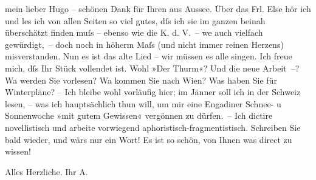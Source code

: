 \pstart
           mein lieber Hugo – schönen Dank für Ihren \label{K_L02419-1v}\label{K_L02419-1} aus Aussee. Über das Frl. Else hör ich und les ich von allen Seiten so viel gutes, dſs ich sie im
               ganzen beinah überschätzt finden muſs – ebenso wie die K. d. V. – we{\geminationn} auch vielfach
               gewürdigt, – doch noch in höherm Maſs (und nicht immer reinen Herzens) misverstanden.
               Nun es ist das alte Lied – wir müssen es alle singen. Ich freue mich, dſs Ihr Stück
               vollendet ist. Wohl »Der Thurm«? Und die neue
               Arbeit –? Wa{\geminationn} werden Sie vorlesen? Wa{\geminationn} kommen Sie nach Wien? Was haben Sie für Winterpläne? – Ich bleibe wohl vorläufig hier; im
                  Jänner{ }soll {\pb}ich in der Schweiz lesen, – was ich hauptsächlich thun
               will, um mir eine Engadiner Schnee- u
               Sonnenwoche \strikeout{\textcolor{gray}{ver}} »mit gutem Gewissen« vergönnen zu dürfen. – Ich dictire novellistisch und
               arbeite vorwiegend aphoristisch-fragmentistisch. Schreiben Sie bald wieder, und wärs
               nur ein Wort! Es ist so schön, von Ihnen was direct zu wissen!\pend
           
\pstart
           Alles Herzliche. Ihr \spacefill\mbox{A.}\pend
           \endnumbering{}  \newcommand{\dateiname}{L02419}\newcommand{\titel}{Arthur Schnitzler an Hugo Hofmannsthal, 6. 11. 1924}\newcommand{\editorInnen}{Martin Anton Müller und Gerd-Hermann Susen}
